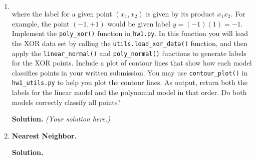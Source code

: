 \documentclass{article}
\theoremstyle{definition}
\theoremstyle{remark}
\newenvironment{Q}
        {%
          \clearpage
          \item
        }
        {%
          \phantom{s} %
          \bigskip
          \textbf{Solution.}
        }
\begin{document}
\begin{enumerate}
\begin{Q}
\begin{enumerate}
\begin{align*}
    \end{align*}
    where the label for a given point $(x_1,x_2)$ is given by its product $x_1x_2$.  For example, the point $(-1,+1)$ would be given label $y = (-1)(1) = -1$.  Implement the \texttt{poly\_xor()} function in \texttt{hw1.py}.  In this function you will load the XOR data set by calling the \texttt{utils.load\_xor\_data()} function, and then apply the \texttt{linear\_normal()} and \texttt{poly\_normal()} functions to generate labels for the XOR points. Include a plot of contour lines that show how each model classifies points in your written submission.  You may use \texttt{contour\_plot()} in \texttt{hw1\_utils.py} to help you plot the contour lines.  As output, return both the labels for the linear model and the polynomial model in that order.  Do both models correctly classify all points?
          \end{enumerate}
          \end{Q}
          \emph{(Your solution here.)}
          \begin{Q}
    	  \textbf{Nearest Neighbor.}


\end{Q}
\end{enumerate}
\end{document}
